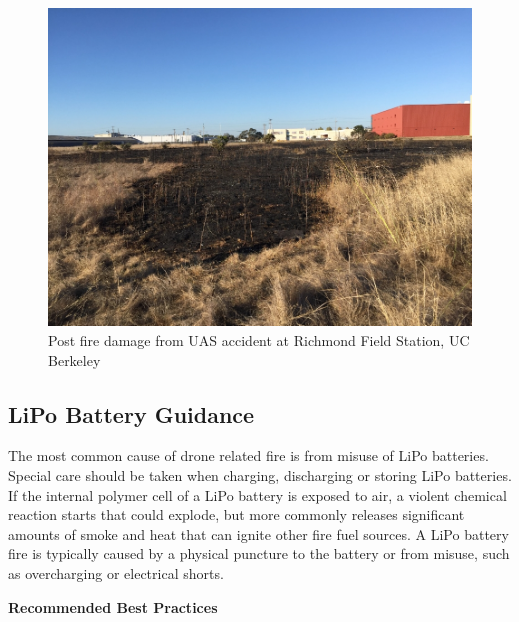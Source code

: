 \documentclass[
  12pt,
]{book}
\begin{document}
\begin{figure}

{\centering \includegraphics[width=0.75\linewidth]{images/fire_damage} 

}

\caption{Post fire damage from UAS accident at Richmond Field Station, UC Berkeley}\label{fig:fire-damage}
\end{figure}

\hypertarget{lipo-battery-guidance}{%
\subsection{LiPo Battery Guidance}\label{lipo-battery-guidance}}

The most common cause of drone related fire is from misuse of LiPo batteries. Special care should be taken when charging, discharging or storing LiPo batteries. If the internal polymer cell of a LiPo battery is exposed to air, a violent chemical reaction starts that could explode, but more commonly releases significant amounts of smoke and heat that can ignite other fire fuel sources. A LiPo battery fire is typically caused by a physical puncture to the battery or from misuse, such as overcharging or electrical shorts.

\textbf{Recommended Best Practices}
\end{document}
